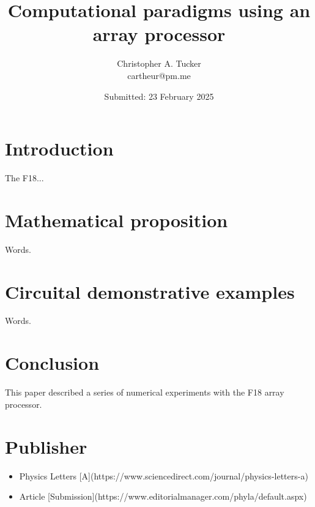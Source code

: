 \documentclass[]{article}
\begin{document}
\title{Computational paradigms using an array processor }

\author{Christopher A. Tucker\\cartheur@pm.me\\}

\date{Submitted: 23 February 2025}

\maketitle


\section{Introduction}
The F18...

\section{Mathematical proposition}
Words.

\section{Circuital demonstrative examples}
Words.

\section{Conclusion}
This paper described a series of numerical experiments with the F18 array processor. 

\section{Publisher}
\begin{itemize}
  \item  Physics Letters [A](https://www.sciencedirect.com/journal/physics-letters-a)
  \item Article [Submission](https://www.editorialmanager.com/phyla/default.aspx)
\end{itemize}
\end{document}
